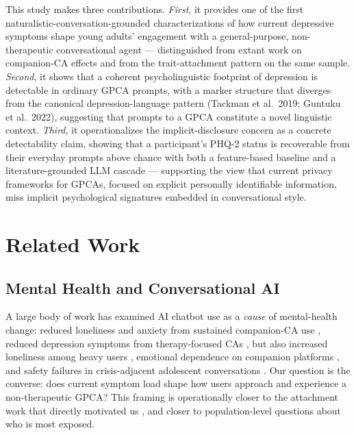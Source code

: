 \documentclass[letterpaper]{article}
\begin{document}
This study makes three contributions. \emph{First}, it provides one of the first naturalistic-conversation-grounded characterizations of how current depressive symptoms shape young adults' engagement with a general-purpose, non-therapeutic conversational agent --- distinguished from extant work on companion-CA effects \citep{maples2024loneliness,laestadius2024replika} and from the trait-attachment pattern \citep{anon2026attachment} on the same sample. \emph{Second}, it shows that a coherent psycholinguistic footprint of depression is detectable in ordinary GPCA prompts, with a marker structure that diverges from the canonical depression-language pattern (Tackman et al.\ 2019; Guntuku et al.\ 2022), suggesting that prompts to a GPCA constitute a novel linguistic context. \emph{Third}, it operationalizes the implicit-disclosure concern as a concrete detectability claim, showing that a participant's PHQ-2 status is recoverable from their everyday prompts above chance with both a feature-based baseline and a literature-grounded LLM cascade --- supporting the view that current privacy frameworks for GPCAs, focused on explicit personally identifiable information, miss implicit psychological signatures embedded in conversational style.

\section{Related Work}

\subsection{Mental Health and Conversational AI}
A large body of work has examined AI chatbot use as a \emph{cause} of mental-health change: reduced loneliness and anxiety from sustained companion-CA use \citep{maples2024loneliness}, reduced depression symptoms from therapy-focused CAs \citep{dosovitsky2021depression}, but also increased loneliness among heavy users \citep{phang2025affective}, emotional dependence on companion platforms \citep{laestadius2024replika}, and safety failures in crisis-adjacent adolescent conversations \citep{clark2025limits}. Our question is the converse: does current symptom load shape how users approach and experience a non-therapeutic GPCA? This framing is operationally closer to the attachment work that directly motivated us \citep{anon2026attachment}, and closer to population-level questions about who is most exposed.
\end{document}
